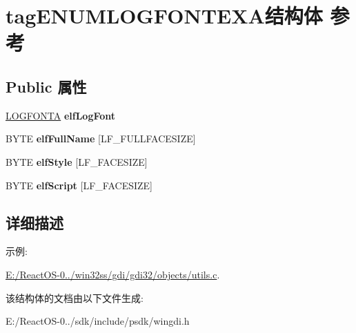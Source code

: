 \hypertarget{structtag_e_n_u_m_l_o_g_f_o_n_t_e_x_a}{}\section{tag\+E\+N\+U\+M\+L\+O\+G\+F\+O\+N\+T\+E\+X\+A结构体 参考}
\label{structtag_e_n_u_m_l_o_g_f_o_n_t_e_x_a}
\subsection*{Public 属性}
\begin{DoxyCompactItemize}
\item 
\mbox{\label{structtag_e_n_u_m_l_o_g_f_o_n_t_e_x_a_a2d2a577fca239dc3741b54af388e81d7}} 
\hyperlink{struct_l_o_g_f_o_n_t_a}{L\+O\+G\+F\+O\+N\+TA} {\bfseries elf\+Log\+Font}
\item 
\mbox{\label{structtag_e_n_u_m_l_o_g_f_o_n_t_e_x_a_a7e9f4a80116ec0aafc4ac96330eeb39a}} 
B\+Y\+TE {\bfseries elf\+Full\+Name} \mbox{[}L\+F\+\_\+\+F\+U\+L\+L\+F\+A\+C\+E\+S\+I\+ZE\mbox{]}
\item 
\mbox{\label{structtag_e_n_u_m_l_o_g_f_o_n_t_e_x_a_abb691b72849613ac3c257cc8a9dd0ead}} 
B\+Y\+TE {\bfseries elf\+Style} \mbox{[}L\+F\+\_\+\+F\+A\+C\+E\+S\+I\+ZE\mbox{]}
\item 
\mbox{\label{structtag_e_n_u_m_l_o_g_f_o_n_t_e_x_a_aaff9d4adbe7ad584ec40f7fb4f06422a}} 
B\+Y\+TE {\bfseries elf\+Script} \mbox{[}L\+F\+\_\+\+F\+A\+C\+E\+S\+I\+ZE\mbox{]}
\end{DoxyCompactItemize}


\subsection{详细描述}
\begin{Desc}
\item[示例\+: ]\par
\hyperlink{_e_1_2_react_o_s-0_84_86_2win32ss_2gdi_2gdi32_2objects_2utils_8c-example}{E\+:/\+React\+O\+S-\/0../win32ss/gdi/gdi32/objects/utils.\+c}.\end{Desc}


该结构体的文档由以下文件生成\+:\begin{DoxyCompactItemize}
\item 
E\+:/\+React\+O\+S-\/0../sdk/include/psdk/wingdi.\+h\end{DoxyCompactItemize}
